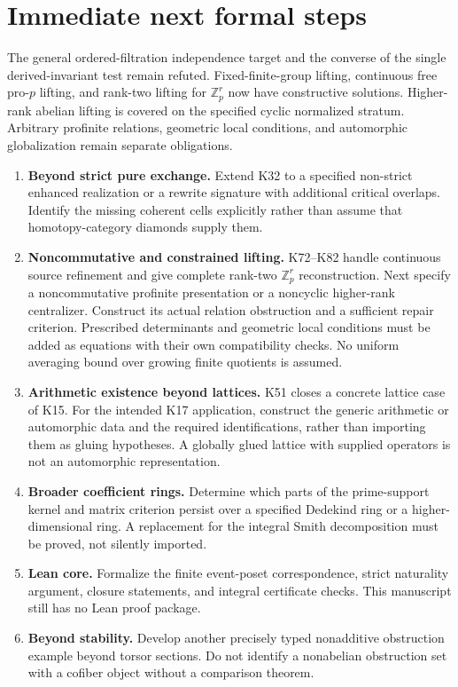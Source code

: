 \documentclass[11pt]{article}
\theoremstyle{definition}
\theoremstyle{remark}
\begin{document}
\section{Immediate next formal steps}

The general ordered-filtration independence target and the converse of the single derived-invariant test remain refuted. Fixed-finite-group lifting, continuous free pro-$p$ lifting, and rank-two lifting for $\mathbb Z_p^r$ now have constructive solutions. Higher-rank abelian lifting is covered on the specified cyclic normalized stratum. Arbitrary profinite relations, geometric local conditions, and automorphic globalization remain separate obligations.

\begin{enumerate}
\item \textbf{Beyond strict pure exchange.} Extend K32 to a specified non-strict enhanced realization or a rewrite signature with additional critical overlaps. Identify the missing coherent cells explicitly rather than assume that homotopy-category diamonds supply them.
\item \textbf{Noncommutative and constrained lifting.} K72--K82 handle continuous source refinement and give complete rank-two $\mathbb Z_p^r$ reconstruction. Next specify a noncommutative profinite presentation or a noncyclic higher-rank centralizer. Construct its actual relation obstruction and a sufficient repair criterion. Prescribed determinants and geometric local conditions must be added as equations with their own compatibility checks. No uniform averaging bound over growing finite quotients is assumed.
\item \textbf{Arithmetic existence beyond lattices.} K51 closes a concrete lattice case of K15. For the intended K17 application, construct the generic arithmetic or automorphic data and the required identifications, rather than importing them as gluing hypotheses. A globally glued lattice with supplied operators is not an automorphic representation.
\item \textbf{Broader coefficient rings.} Determine which parts of the prime-support kernel and matrix criterion persist over a specified Dedekind ring or a higher-dimensional ring. A replacement for the integral Smith decomposition must be proved, not silently imported.
\item \textbf{Lean core.} Formalize the finite event-poset correspondence, strict naturality argument, closure statements, and integral certificate checks. This manuscript still has no Lean proof package.
\item \textbf{Beyond stability.} Develop another precisely typed nonadditive obstruction example beyond torsor sections. Do not identify a nonabelian obstruction set with a cofiber object without a comparison theorem.
\end{enumerate}
\end{document}
